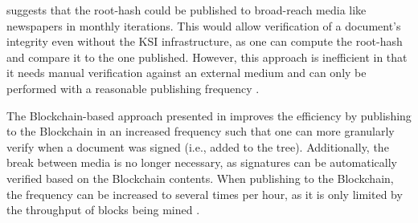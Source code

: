 \cite{hutchison_keyless_2013} suggests that the root-hash could be published to broad-reach media like newspapers in monthly iterations. This would allow verification of a document's integrity even without the KSI infrastructure, as one can compute the root-hash and compare it to the one published. However, this approach is inefficient in that it needs manual verification against an external medium and can only be performed with a reasonable publishing frequency \cite{jamthagen_blockchain-based_2016}.

The Blockchain-based approach presented in \cite{jamthagen_blockchain-based_2016} improves the efficiency by publishing to the Blockchain in an increased frequency such that one can more granularly verify when a document was signed (i.e., added to the tree). Additionally, the break between media is no longer necessary, as signatures can be automatically verified based on the Blockchain contents. When publishing to the Blockchain, the frequency can be increased to several times per hour, as it is only limited by the throughput of blocks being mined \cite{jamthagen_blockchain-based_2016}.
